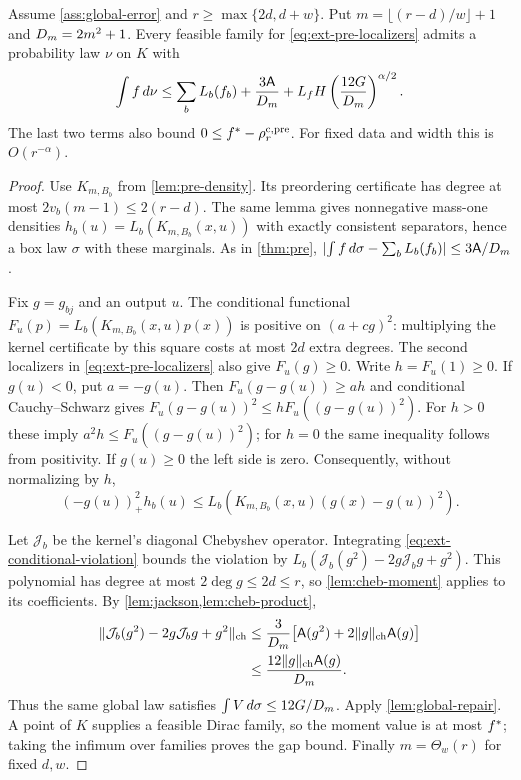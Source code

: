 \begin{theorem}\label{thm:constr-pre}
Assume \cref{ass:global-error} and
$r\ge\max\{2d,d+w\}$. Put $m=\lfloor(r-d)/w\rfloor+1$ and
$D_m=2m^2+1$. Every feasible family for
\eqref{eq:ext-pre-localizers} admits a probability law $\nu$ on $K$ with
\begin{equation}\label{eq:ext-pre-bound}
 \int f\,d\nu\le\sum_bL_b(f_b)+\frac{3\mathsf{A}}{D_m}
       +L_fH\left(\frac{12G}{D_m}\right)^{\alpha/2}.
\end{equation}
The last two terms also bound
$0\le f^{*}-\rho_r^{\mathrm{c,pre}}$. For fixed data and width this is
$O(r^{-\alpha})$.
\end{theorem}
\begin{proof}
Use $K_{m,B_b}$ from \cref{lem:pre-density}. Its preordering
certificate has degree at most $2v_b(m-1)\le2(r-d)$. The same lemma gives
nonnegative mass-one densities $h_b(u)=L_b(K_{m,B_b}(x,u))$ with exactly
consistent separators, hence a box law $\sigma$ with these marginals.
As in \cref{thm:pre},
$\lvert \int f\,d\sigma-\sum_bL_b(f_b)\rvert\le3\mathsf{A}/D_m$.

Fix $g=g_{bj}$ and an output $u$. The conditional functional
$F_u(p)=L_b(K_{m,B_b}(x,u)p(x))$ is positive on
$(a+cg)^2$: multiplying the kernel certificate by this square costs at
most $2d$ extra degrees. The second localizers in
\eqref{eq:ext-pre-localizers} also give $F_u(g)\ge0$. Write
$h=F_u(1)\ge0$. If $g(u)<0$, put $a=-g(u)$. Then
$F_u(g-g(u))\ge ah$ and conditional Cauchy--Schwarz gives
$F_u(g-g(u))^2\le hF_u((g-g(u))^2)$.
For $h>0$ these imply $a^2h\le F_u((g-g(u))^2)$; for $h=0$ the same
inequality follows from positivity. If $g(u)\ge0$ the left side is zero.
Consequently, without normalizing by $h$,
\begin{equation}\label{eq:ext-conditional-violation}
 (-g(u))_+^2h_b(u)\le L_b(K_{m,B_b}(x,u)(g(x)-g(u))^2).
\end{equation}

Let $\mathcal J_b$ be the kernel's diagonal Chebyshev operator. Integrating
\eqref{eq:ext-conditional-violation} bounds the violation by
$L_b(\mathcal J_b(g^2)-2g\mathcal J_bg+g^2)$.
This polynomial has degree at most $2\deg g\le2d\le r$, so
\cref{lem:cheb-moment} applies to its coefficients. By
\cref{lem:jackson,lem:cheb-product},
\begin{align*}
 \lVert \mathcal J_b(g^2)-2g\mathcal J_bg+g^2\rVert_{\mathrm{ch}}
 &\le\frac3{D_m}\bigl[\mathsf{A}(g^2)+2\lVert g\rVert_{\mathrm{ch}}\mathsf{A}(g)\bigr]\\
 &\le\frac{12\lVert g\rVert_{\mathrm{ch}}\mathsf{A}(g)}{D_m}.
\end{align*}
Thus the same global law satisfies $\int V\,d\sigma\le12G/D_m$.
Apply \cref{lem:global-repair}. A point of $K$ supplies a feasible Dirac
family, so the moment value is at most $f^{*}$; taking the infimum over
families proves the gap bound. Finally $m=\Theta_w(r)$ for fixed $d,w$.
\end{proof}

